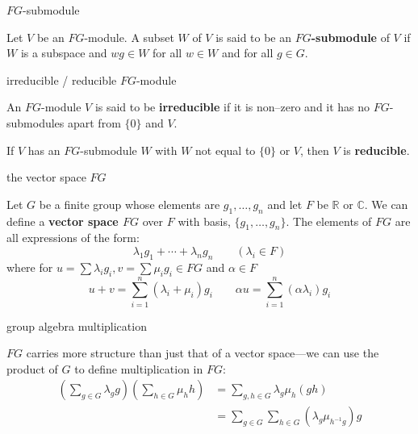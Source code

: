 \documentclass[avery5371,grid]{flashcards}
\newcommand{\R}{\mathbb{R}}
\newcommand{\C}{\mathbb{C}}
\newcommand{\defn}[1]{\textbf{#1}}
\begin{document}
\begin{flashcard}[Definition 5.1]{$FG$-submodule}

  Let $V$ be an $FG$-module. A subset $W$ of $V$ is said to be an
  \defn{$FG$-submodule} of $V$ if $W$ is a subspace and $wg \in W$ for
  all $w\in W$ and for all $g\in G$.

\end{flashcard}

\begin{flashcard}[Definition 5.3]{irreducible / reducible $FG$-module}

  An $FG$-module $V$ is said to be \defn{irreducible} if it is
  non--zero and it has no $FG$-submodules apart from $\{0\}$ and $V$.

  \bigskip

  If $V$ has an $FG$-submodule $W$ with $W$ not equal to $\{0\}$ or
  $V$, then $V$ is \defn{reducible}.

\end{flashcard}

\begin{flashcard}[Definition]{the vector space $FG$}

  Let $G$ be a finite group whose elements are $g_1, \ldots, g_n$ and
  let $F$ be $\R$ or $\C$. We can define a \defn{vector space $FG$} over
  $F$ with basis, $\{g_1, \ldots, g_n \}$. The elements of $FG$ are
  all expressions of the form:
  \[
    \lambda_1 g_1 + \cdots + \lambda_n g_n \qquad (\lambda_i \in F)
  \]
  where for $u=\sum \lambda_i g_i, v = \sum \mu_i g_i \in FG$ and
  $\alpha \in F$
  \[
    u+v = \sum_{i=1}^n (\lambda_i + \mu_i)g_i \qquad
    \alpha u = \sum_{i=1}^n (\alpha \lambda_i) g_i
  \]

\end{flashcard}

\begin{flashcard}[Definition]{group algebra multiplication}

  $FG$ carries more structure than just that of a vector space---we
  can use the product of $G$ to define multiplication in $FG$:
  \begin{align*}
    \left( \sum_{g\in G} \lambda_g g \right) \left( \sum_{h\in G} \mu_h h \right)
    &= \sum_{g,h \in G} \lambda_g \mu_h (gh) \\
    &= \sum_{g \in G} \sum_{h \in G} (\lambda_g \mu_{h^{-1}g}) g
  \end{align*}

\end{flashcard}
\end{document}

